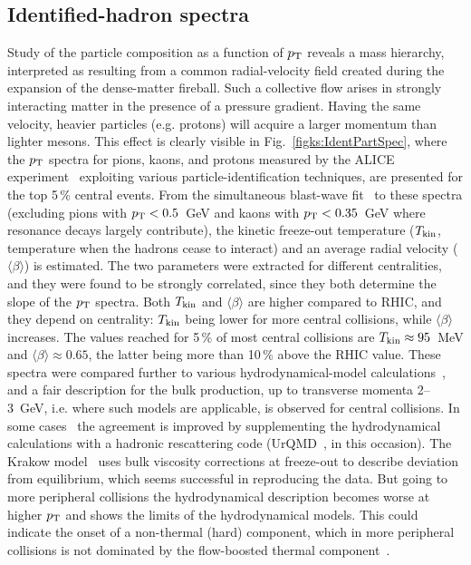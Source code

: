 \subsection{Identified-hadron spectra}
\label{subsecks:identspectra}
Study of the particle composition as a function of $p_{\rm T}$ reveals a mass hierarchy, interpreted as resulting from a common radial-velocity field created during the expansion of the dense-matter fireball. Such a collective flow arises in strongly interacting matter in the presence of a pressure gradient. Having the same velocity, heavier particles (e.g. protons) will acquire a larger momentum than lighter mesons. This effect is clearly visible in Fig.~\ref{figks:IdentPartSpec}, where the $p_{\rm T}$ spectra for pions, kaons, and protons measured by the ALICE experiment~\cite{Abelev:2012wca,Abelev:2013vea} exploiting various particle-identification techniques, are presented for the top 5\,\% central events. From the simultaneous blast-wave fit~\cite{Schnedermann:1993ws} to these spectra (excluding pions with $p_{\rm T} < 0.5$~GeV and kaons with $p_{\rm T} < 0.35$~GeV where resonance decays largely contribute), the kinetic freeze-out temperature ($T_{\rm kin}$, temperature when the hadrons cease to interact) and an average radial velocity ($\langle \beta \rangle$) is estimated. The two parameters were extracted for different centralities, and they were found to be strongly correlated, since they both determine the slope of the $p_{\rm T}$ spectra. Both $T_{\rm kin}$ and $\langle \beta \rangle$ are higher compared to RHIC, and they depend on centrality: $T_{\rm kin}$ being lower for more central collisions, while $\langle \beta \rangle$ increases. The values reached for 5\,\% of most central collisions are $T_{\rm kin} \approx 95$~MeV and $\langle \beta \rangle \approx 0.65$, the latter being more than 10\,\% above the RHIC value. These spectra were compared further to various hydrodynamical-model calculations~\cite{Shen:2011eg,Bozek:2012qs,Werner:2012xh,Karpenko:2012yf}, and a fair description for the bulk production, up to transverse momenta 2--3~GeV, i.e. where such models are applicable, is observed for central collisions. In some cases~\cite{Karpenko:2012yf,Karpenko:2011qn} the agreement is improved by supplementing the hydrodynamical calculations with a hadronic rescattering code (UrQMD~\cite{Bass:1998ca}, in this occasion). The Krakow model~\cite{Bozek:2011ua,Bozek:2011gq} uses bulk viscosity corrections at freeze-out to describe deviation from equilibrium, which seems successful in reproducing the data. But going to more peripheral collisions the hydrodynamical description becomes worse at higher $p_{\rm T}$ and shows the limits of the hydrodynamical models. This could indicate the onset of a non-thermal (hard) component, which in more peripheral collisions is not dominated by the flow-boosted thermal component~\cite{Bozek:2012qs}.


